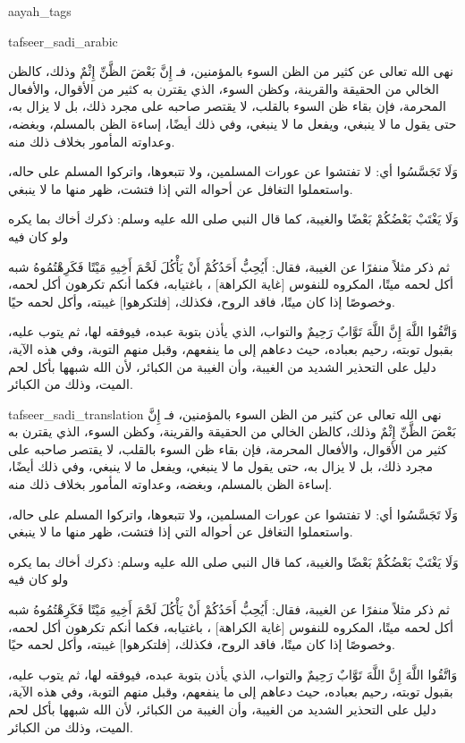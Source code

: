 \begin{taggedblock}{aayah_tags}
\end{taggedblock}
\begin{taggedblock}{tafseer_sadi_arabic}
\begin{Arabic}
نهى الله تعالى عن كثير من الظن السوء  بالمؤمنين، فـ
{ إِنَّ بَعْضَ الظَّنِّ إِثْمٌ }
وذلك، كالظن الخالي من الحقيقة والقرينة، وكظن السوء، الذي يقترن به كثير من الأقوال، والأفعال المحرمة، فإن بقاء ظن السوء بالقلب، لا يقتصر صاحبه على مجرد ذلك، بل لا يزال به، حتى يقول ما لا ينبغي، ويفعل ما لا ينبغي، وفي ذلك أيضًا، إساءة الظن بالمسلم، وبغضه، وعداوته المأمور بخلاف ذلك منه.

{ وَلَا تَجَسَّسُوا }
أي: لا تفتشوا عن عورات المسلمين، ولا تتبعوها، واتركوا  المسلم على حاله، واستعملوا التغافل عن أحواله  التي إذا فتشت، ظهر منها ما لا ينبغي.

{ وَلَا يَغْتَبْ بَعْضُكُمْ بَعْضًا }
والغيبة، كما قال النبي صلى الله عليه وسلم:
{ ذكرك أخاك بما يكره ولو كان فيه }

ثم ذكر مثلاً منفرًا عن الغيبة، فقال:
{ أَيُحِبُّ أَحَدُكُمْ أَنْ يَأْكُلَ لَحْمَ أَخِيهِ مَيْتًا فَكَرِهْتُمُوهُ }
شبه أكل لحمه ميتًا، المكروه للنفوس
[غاية الكراهة]
، باغتيابه، فكما أنكم تكرهون أكل لحمه، وخصوصًا إذا كان ميتًا، فاقد الروح، فكذلك،
[فلتكرهوا]
غيبته، وأكل لحمه حيًا.

{ وَاتَّقُوا اللَّهَ إِنَّ اللَّهَ تَوَّابٌ رَحِيمٌ }
والتواب، الذي يأذن بتوبة عبده، فيوفقه لها، ثم يتوب عليه، بقبول توبته، رحيم بعباده، حيث دعاهم إلى ما ينفعهم، وقبل منهم التوبة، وفي هذه الآية، دليل على التحذير الشديد من الغيبة، وأن الغيبة من الكبائر، لأن الله شبهها بأكل لحم الميت، وذلك من الكبائر.
\end{Arabic}
\end{taggedblock}
\begin{taggedblock}{tafseer_sadi_translation}
نهى الله تعالى عن كثير من الظن السوء  بالمؤمنين، فـ
{ إِنَّ بَعْضَ الظَّنِّ إِثْمٌ }
وذلك، كالظن الخالي من الحقيقة والقرينة، وكظن السوء، الذي يقترن به كثير من الأقوال، والأفعال المحرمة، فإن بقاء ظن السوء بالقلب، لا يقتصر صاحبه على مجرد ذلك، بل لا يزال به، حتى يقول ما لا ينبغي، ويفعل ما لا ينبغي، وفي ذلك أيضًا، إساءة الظن بالمسلم، وبغضه، وعداوته المأمور بخلاف ذلك منه.

{ وَلَا تَجَسَّسُوا }
أي: لا تفتشوا عن عورات المسلمين، ولا تتبعوها، واتركوا  المسلم على حاله، واستعملوا التغافل عن أحواله  التي إذا فتشت، ظهر منها ما لا ينبغي.

{ وَلَا يَغْتَبْ بَعْضُكُمْ بَعْضًا }
والغيبة، كما قال النبي صلى الله عليه وسلم:
{ ذكرك أخاك بما يكره ولو كان فيه }

ثم ذكر مثلاً منفرًا عن الغيبة، فقال:
{ أَيُحِبُّ أَحَدُكُمْ أَنْ يَأْكُلَ لَحْمَ أَخِيهِ مَيْتًا فَكَرِهْتُمُوهُ }
شبه أكل لحمه ميتًا، المكروه للنفوس
[غاية الكراهة]
، باغتيابه، فكما أنكم تكرهون أكل لحمه، وخصوصًا إذا كان ميتًا، فاقد الروح، فكذلك،
[فلتكرهوا]
غيبته، وأكل لحمه حيًا.

{ وَاتَّقُوا اللَّهَ إِنَّ اللَّهَ تَوَّابٌ رَحِيمٌ }
والتواب، الذي يأذن بتوبة عبده، فيوفقه لها، ثم يتوب عليه، بقبول توبته، رحيم بعباده، حيث دعاهم إلى ما ينفعهم، وقبل منهم التوبة، وفي هذه الآية، دليل على التحذير الشديد من الغيبة، وأن الغيبة من الكبائر، لأن الله شبهها بأكل لحم الميت، وذلك من الكبائر.
\end{taggedblock}

\begin{comment}
Please use the following for footnotes:- Sample\footnoteQ{Text of Qur'an footnote goes here.}.
Sample\footnoteT{Text of Tafseer footnote goes here.}.
\end{comment}